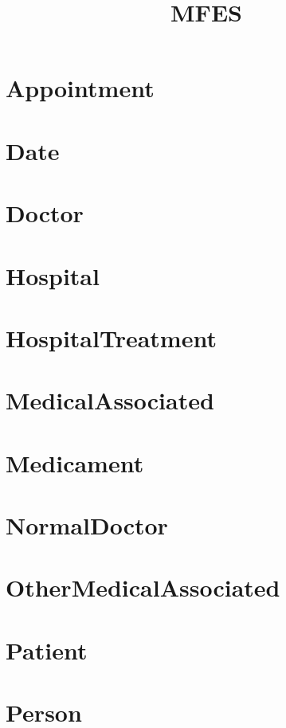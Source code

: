 \documentclass{article}
\begin{document}
\title{MFES}
\author{}
\maketitle
\tableofcontents

\section{Appointment}

\section{Date}

\section{Doctor}

\section{Hospital}

\section{HospitalTreatment}

\section{MedicalAssociated}

\section{Medicament}

\section{NormalDoctor}

\section{OtherMedicalAssociated}

\section{Patient}

\section{Person}

\end{document}
